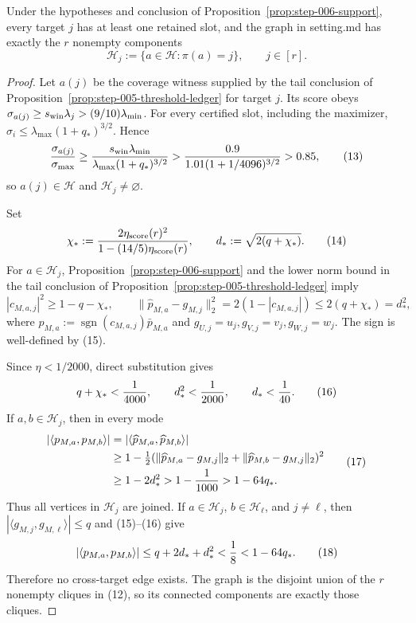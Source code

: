 \begin{proposition}\label{prop:step-006-graph}
Under the hypotheses and conclusion of
Proposition~\ref{prop:step-006-support}, every target \(j\) has at least one
retained slot, and the graph in setting.md has exactly the \(r\) nonempty
components
\[
 \mathcal H_j:=\{a\in\mathcal H:\pi(a)=j\},\qquad j\in[r]. \tag{12}
\]

\begin{proof}
Let \(a(j)\) be the coverage witness supplied by the tail conclusion of Proposition~\ref{prop:step-005-threshold-ledger} for
target \(j\). Its score obeys
\(\sigma_{a(j)}\ge s_{\rm win}\lambda_j>(9/10)\lambda_{\min}\).
For every certified slot, including the maximizer,
\(\sigma_i\le\lambda_{\max}(1+q_*)^{3/2}\). Hence
\[
 {\sigma_{a(j)}\over\sigma_{\max}}
 \ge {s_{\rm win}\lambda_{\min}\over
 \lambda_{\max}(1+q_*)^{3/2}}
 >{0.9\over1.01(1+1/4096)^{3/2}}>0.85, \tag{13}
\]
so \(a(j)\in\mathcal H\) and \(\mathcal H_j\ne\varnothing\).

Set
\[
 \chi_*:={2\eta_{\rm score}(r)^2\over
 1-(14/5)\eta_{\rm score}(r)},\qquad
 d_*:=\sqrt{2(q+\chi_*)}. \tag{14}
\]
For \(a\in\mathcal H_j\), Proposition~\ref{prop:step-006-support} and
the lower norm bound in the tail conclusion of Proposition~\ref{prop:step-005-threshold-ledger} imply
\[
 |c_{M,a,j}|^2\ge1-q-\chi_*,\qquad
 \|\widehat p_{M,a}-g_{M,j}\|_2^2
 =2(1-|c_{M,a,j}|)\le2(q+\chi_*)=d_*^2, \tag{15}
\]
where \(\widehat p_{M,a}:=\operatorname{sgn}(c_{M,a,j})\bar p_{M,a}\) and
\(g_{U,j}=u_j,g_{V,j}=v_j,g_{W,j}=w_j\). The sign is well-defined by
(15).

Since \(\eta<1/2000\), direct substitution gives
\[
 q+\chi_*<{1\over4000},\qquad d_*^2<{1\over2000},\qquad d_*<{1\over40}. \tag{16}
\]
If \(a,b\in\mathcal H_j\), then in every mode
\[
 \begin{aligned}
 |\langle p_{M,a},p_{M,b}\rangle|
 &=|\langle\widehat p_{M,a},\widehat p_{M,b}\rangle|\\
 &\ge1-\tfrac12(\|\widehat p_{M,a}-g_{M,j}\|_2
             +\|\widehat p_{M,b}-g_{M,j}\|_2)^2\\
 &\ge1-2d_*^2>1-{1\over1000}>1-64q_*.
 \end{aligned} \tag{17}
\]
Thus all vertices in \(\mathcal H_j\) are joined. If \(a\in\mathcal H_j\),
\(b\in\mathcal H_\ell\), and \(j\ne\ell\), then
\(|\langle g_{M,j},g_{M,\ell}\rangle|\le q\) and (15)--(16) give
\[
 |\langle p_{M,a},p_{M,b}\rangle|
 \le q+2d_*+d_*^2<{1\over8}<1-64q_*.
 \tag{18}
\]
Therefore no cross-target edge exists. The graph is the disjoint union of
the \(r\) nonempty cliques in (12), so its connected components are exactly
those cliques. 


\end{proof}
\end{proposition}
